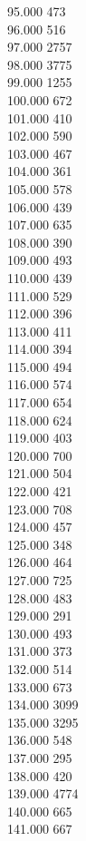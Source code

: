 { 95.000	473 \\
 96.000	516 \\
 97.000	2757 \\
 98.000	3775 \\
 99.000	1255 \\
 100.000	672 \\
 101.000	410 \\
 102.000	590 \\
 103.000	467 \\
 104.000	361 \\
 105.000	578 \\
 106.000	439 \\
 107.000	635 \\
 108.000	390 \\
 109.000	493 \\
 110.000	439 \\
 111.000	529 \\
 112.000	396 \\
 113.000	411 \\
 114.000	394 \\
 115.000	494 \\
 116.000	574 \\
 117.000	654 \\
 118.000	624 \\
 119.000	403 \\
 120.000	700 \\
 121.000	504 \\
 122.000	421 \\
 123.000	708 \\
 124.000	457 \\
 125.000	348 \\
 126.000	464 \\
 127.000	725 \\
 128.000	483 \\
 129.000	291 \\
 130.000	493 \\
 131.000	373 \\
 132.000	514 \\
 133.000	673 \\
 134.000	3099 \\
 135.000	3295 \\
 136.000	548 \\
 137.000	295 \\
 138.000	420 \\
 139.000	4774 \\
 140.000	665 \\
 141.000	667 \\
}
